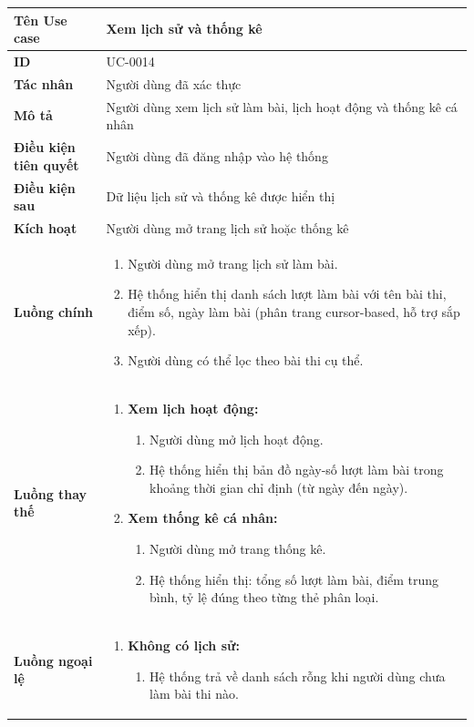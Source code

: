 {
\small
\renewcommand{\arraystretch}{1.15}

\begin{tabularx}{\textwidth}{|>{\raggedright\arraybackslash}p{3.5cm}|>{\raggedright\arraybackslash}X|}
\hline
\textbf{Tên Use case} & Xem lịch sử và thống kê \\
\hline
\textbf{ID} & UC-0014 \\
\hline
\textbf{Tác nhân} & Người dùng đã xác thực \\
\hline
\textbf{Mô tả} & Người dùng xem lịch sử làm bài, lịch hoạt động và thống kê cá nhân \\
\hline
\textbf{Điều kiện tiên quyết} & Người dùng đã đăng nhập vào hệ thống \\
\hline
\textbf{Điều kiện sau} & Dữ liệu lịch sử và thống kê được hiển thị \\
\hline
\textbf{Kích hoạt} & Người dùng mở trang lịch sử hoặc thống kê \\
\hline
\textbf{Luồng chính} &
\begin{enumerate}
    \item Người dùng mở trang lịch sử làm bài.
    \item Hệ thống hiển thị danh sách lượt làm bài với tên bài thi, điểm số, ngày làm bài (phân trang cursor-based, hỗ trợ sắp xếp).
    \item Người dùng có thể lọc theo bài thi cụ thể.
\end{enumerate} \\
\hline
\textbf{Luồng thay thế} &
\begin{enumerate}
    \item \textbf{Xem lịch hoạt động:}
    \begin{enumerate}
        \item[1A.] Người dùng mở lịch hoạt động.
        \item[2A.] Hệ thống hiển thị bản đồ ngày-số lượt làm bài trong khoảng thời gian chỉ định (từ ngày đến ngày).
    \end{enumerate}
    \item \textbf{Xem thống kê cá nhân:}
    \begin{enumerate}
        \item[1B.] Người dùng mở trang thống kê.
        \item[2B.] Hệ thống hiển thị: tổng số lượt làm bài, điểm trung bình, tỷ lệ đúng theo từng thẻ phân loại.
    \end{enumerate}
\end{enumerate} \\
\hline
\textbf{Luồng ngoại lệ} &
\begin{enumerate}
    \item \textbf{Không có lịch sử:}
    \begin{enumerate}
        \item[2Err.] Hệ thống trả về danh sách rỗng khi người dùng chưa làm bài thi nào.
    \end{enumerate}
\end{enumerate} \\
\hline
\end{tabularx}
}

